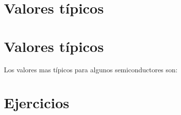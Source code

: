 \section{Valores típicos}



\section{Valores típicos}

Los valores mas típicos para algunos semiconductores son:



\section{Ejercicios}

\tcbstartrecording


